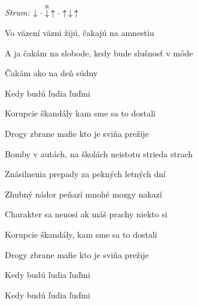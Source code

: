 \begin{song}


\begin{headerbox}
\RaiseBoxWithAccents
\textit{Strum:} $\Down\Miss\PluckDown{R}\Up\Miss\Up\Down\Up$
\end{headerbox}

\begin{hchordbox}
\end{hchordbox}

\Large

\bigskip

\begin{chorusbox}{\Refren}
Vo väzení väzni žijú, čakajú na amnestiu \par
{}A ja čakám na slobode, kedy bude slušnosť v móde \par
{}Čakám ako na deň súdny \par
{}Kedy budú ľudia ľuďmi \par
\end{chorusbox}

\bigskip

 Korupcie škandály  kam sme sa to dostali \par
{} Drogy zbrane mafie kto je sviňa prežije \par
{} Bomby v autách, na školách  neistotu strieda strach \par
{} Znásilnenia prepady za pekných letných dní \par
{} \par

\bigskip

\Refren

\bigskip

 Zhubný nádor peňazí  mnohé mozgy nakazí \par
{} Charakter sa nenosí ak máš prachy niekto si \par
{} Korupcie škandály,  kam sme sa to dostali \par
{} Drogy zbrane mafie kto je sviňa prežije \par
{} \par

\bigskip

\Refren

\bigskip

Kedy budú ľudia ľuďmi \par
{}Kedy budú ľudia ľuďmi \par

\end{song}